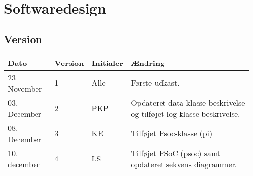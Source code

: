 \chapter{Softwaredesign}

\section*{Version}
\begin{table}[h]
	\centering
	\begin{tabularx}{\textwidth - 2cm}{|l|l|l|X|}
	\hline
	Dato			& Version		& Initialer 	& Ændring																	\\ \hline
	23. November	& 1 			& Alle			& Første udkast. 															\\ \hline
	03. December 	& 2 			& PKP			& Opdateret data-klasse beskrivelse og tilføjet log-klasse beskrivelse. 	\\ \hline
	08. December 	& 3 			& KE			& Tilføjet Psoc-klasse (pi) 											\\ \hline
	10. december 	& 4 			& LS			& Tilføjet PSoC (psoc) samt opdateret sekvens diagrammer.					\\ \hline
\end{tabularx}
\end{table}
\clearpage


\clearpage

\clearpage

\clearpage

